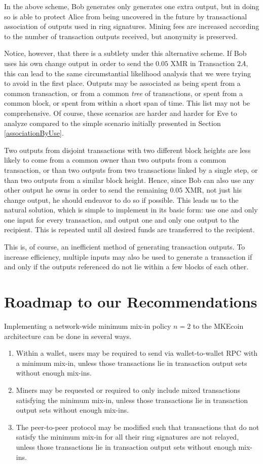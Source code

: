 \documentclass[12pt,english]{mrl}
\theoremstyle{definition}
\numberwithin{equation}{section}
\numberwithin{figure}{section}
\numberwithin{equation}{section}
\numberwithin{equation}{section}
\numberwithin{figure}{section}
\begin{document}
In the above scheme, Bob generates only generates one extra output, but in doing so is able to protect Alice from being uncovered in the future by transactional association of outputs used in ring signatures.  Mining fees are increased according to the number of transaction outputs received, but anonymity is preserved. 

Notice, however, that there is a subtlety under this alternative scheme. If Bob uses his own change output in order to send the $0.05$ XMR in Transaction $2A$, this can lead to the same circumstantial likelihood analysis that we were trying to avoid in the first place. Outputs may be associated as being spent from a common transaction, or from a common \textit{tree} of transactions, or spent from a common block, or spent from within a short span of time. This list may not be comprehensive. Of course, these scenarios are harder and harder for Eve to analyze compared to the simple scenario initially presented in Section \ref{associationByUse}. 

Two outputs from disjoint transactions with two different block heights are less likely to come from a common owner than two outputs from a common transaction, or than two outputs from two transactions linked by a single step, or than two outputs from a similar block height. Hence, since Bob can also use any other output he owns in order to send the remaining $0.05$ XMR, not just his change output, he should endeavor to do so if possible. This leads us to the natural solution, which is simple to implement in its basic form: use one and only one input for every transaction, and output one and only one output to the recipient. This is repeated until all desired funds are transferred to the recipient.

This is, of course, an inefficient method of generating transaction outputs. To increase efficiency, multiple inputs may also be used to generate a transaction if and only if the outputs referenced do not lie within a few blocks of each other.


\section{Roadmap to our Recommendations}\label{softwareImplementation}

Implementing a network-wide minimum mix-in policy $n=2$ to the MKEcoin architecture can be done in several ways.
\begin{enumerate}[(1)]
\item Within a wallet, users may be required to send via wallet-to-wallet RPC with a minimum mix-in, unless those transactions lie in transaction output sets without enough mix-ins.
\item Miners may be requested or required to only include mixed transactions satisfying the minimum mix-in, unless those transactions lie in transaction output sets without enough mix-ins.
\item The peer-to-peer protocol may be modified such that transactions that do not satisfy the minimum mix-in for all their ring signatures are not relayed, unless those transactions lie in transaction output sets without enough mix-ins.
\end{enumerate}
\end{document}
